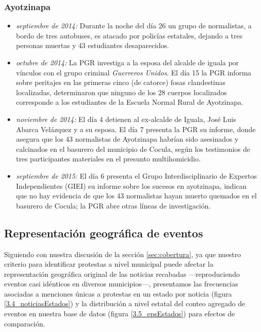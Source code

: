 \documentclass[letterpaper, 11pt]{book}
\theoremstyle{definition}
\theoremstyle{remark}
\begin{document}
\subsubsection{Ayotzinapa}
\label{sec:ayotzinapa}

\begin{itemize}
    \setlength\itemsep{0em}
    \item \emph{septiembre de 2014:} Durante la noche del día 26 un grupo de normalistas, a bordo de tres autobuses, es atacado por policías estatales, dejando a tres personas muertas y 43 estudiantes desaparecidos.
    \item \emph{octubre de 2014:} La PGR investiga a la esposa del alcalde de iguala por vínculos con el grupo criminal \emph{Guerreros Unidos}. 
    El día 15 la PGR informa sobre peritajes en las primeras cinco (de catorce) fosas clandestinas localizadas, determinaron que ninguno de los 28 cuerpos localizados corresponde a los estudiantes de la Escuela Normal Rural de Ayotzinapa.
    \item \emph{noviembre de 2014:} El día 4 detienen al ex-alcalde de Iguala, José Luis Abarca Velázquez y a su esposa. 
    El día 7 presenta la PGR su informe, donde asegura que los 43 normalistas de Ayotzinapa habrían sido asesinados y calcinados en el basurero del municipio de Cocula, según los testimonios de tres participantes materiales en el presunto multihomicidio. 
    \item \emph{septiembre de 2015:} El día 6 presenta el Grupo Interdisciplinario de Expertos Independientes (GIEI) su informe sobre los sucesos en ayotzinapa, indican que no hay evidencia de que los 43 normalistas hayan muerto quemados en el basurero de Cocula; la PGR abre otras líneas de investigación.
\end{itemize}


\subsection{Representación geográfica de eventos}
\label{sec:representacion_geo}

Siguiendo con nuestra discusión de la sección \ref{sec:cobertura}, ya que nuestro criterio para identificar protestas a nivel municipal puede afectar la representación geográfica original de las noticias recabadas ---reproduciendo eventos casi idénticos en diversos municipios---, presentamos las frecuencias asociadas a menciones únicas a protestas en un estado por noticia (figura \ref{3.4_noticiasEstados}) y la distribución a nivel estatal del conteo agregado de eventos en nuestra base de datos (figura \ref{3.5_epsEstados}) para efectos de comparación.  
\end{document}

